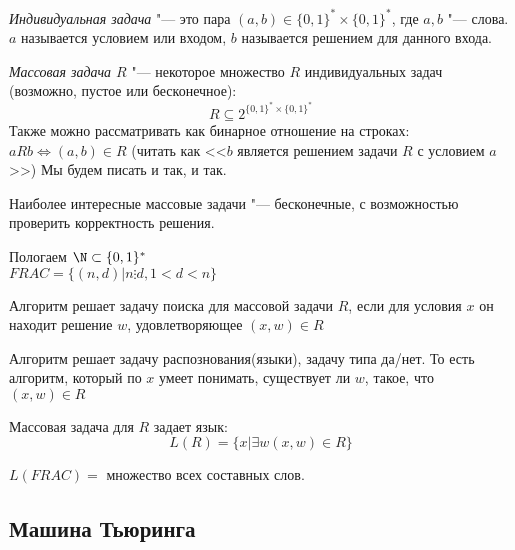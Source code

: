 \begin{Def}
	\textit{Индивидуальная задача} "--- это пара $(a, b) \in \{0, 1\}^* \times \{0, 1\}^*$, где $a, b$ "--- слова.
	$a$ называется условием или входом, $b$ называется решением для данного входа.
\end{Def}

\begin{Def}
	\textit{Массовая задача $R$} "--- некоторое множество $R$ индивидуальных задач (возможно, пустое или бесконечное):
	\[ R \subseteq 2^{\{0,1\}^*\times\{0,1\}^*}\] 
	Также можно рассматривать как бинарное отношение на строках: $aRb \iff (a, b) \in R$
	(читать как <<$b$ является решением задачи $R$ с условием $a$>>)
	Мы будем писать и так, и так.
\end{Def}

\begin{Rem}
	Наиболее интересные массовые задачи "--- бесконечные, с возможностью проверить корректность решения. 
\end{Rem}

\begin{exmp}
	Пологаем $\N \subset \{0, 1\}^*$\\
	$FRAC = \{(n, d) | n \vdots d, 1 < d < n\}$\\
\end{exmp}

\begin{Def}
	Алгоритм решает задачу поиска для массовой задачи $R$, если для условия $x$ он находит решение $w$, удовлетворяющее $(x, w) \in R$
\end{Def}

\begin{Def}
	Алгоритм решает задачу распознования(языки), задачу типа да/нет. 
	То есть алгоритм, который по $x$ умеет понимать, существует ли $w$, такое, что $(x, w) \in R$ 
\end{Def}

\begin{Rem}
	Массовая задача для $R$ задает язык:
	$$L(R) = \{x | \exists w (x, w) \in R\} $$
\end{Rem}

\begin{exmp}
	$L(FRAC) =$ множество всех составных слов. 
\end{exmp}


\subsection{Машина Тьюринга}
